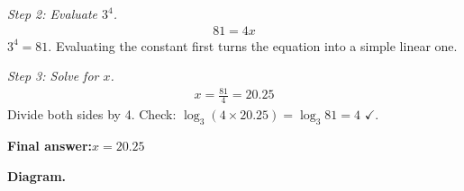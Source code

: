 \documentclass[11pt]{article}
\begin{document}
\textit{Step 2: Evaluate \( 3^4 \).}
\[\begin{gathered}
81 = 4x
\end{gathered}\]
\( 3^4 = 81 \). Evaluating the constant first turns the equation into a simple linear one.

\textit{Step 3: Solve for \( x \).}
\[\begin{gathered}
x = \frac{81}{4} = 20.25
\end{gathered}\]
Divide both sides by 4. Check: \( \log_3(4 \times 20.25) = \log_3 81 = 4 \) $\checkmark$.

\begin{answerbox}
\textbf{Final answer:}\quad \(\displaystyle  x = 20.25 \)
\end{answerbox}
\textbf{Diagram.}

\begin{center}
\end{center}
\end{document}
